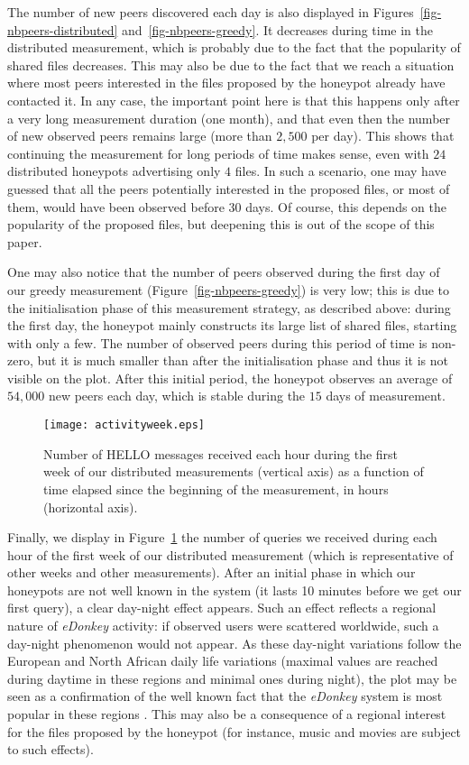 \documentclass[final,
notitlepage,
narroweqnarray,
	inline,
	twoside,
]{ieee}
\begin{document}
The number of new peers discovered each day is also displayed in Figures~\ref{fig-nbpeers-distributed} and~\ref{fig-nbpeers-greedy}. It decreases during time in the distributed measurement, which is probably due to the fact that the popularity of shared files decreases. This may also be due to the fact that we reach a situation where most peers interested in the files proposed by the honeypot already have contacted it. In any case, the important point here is that this happens only after a very long measurement duration (one month), and that even then the number of new observed peers remains large (more than $2,500$ per day). This shows that continuing the measurement for long periods of time makes sense, even with $24$ distributed honeypots advertising only $4$ files. In such a scenario, one may have guessed that all the peers potentially interested in the proposed files, or most of them, would have been observed before $30$ days. Of course, this depends on the popularity of the proposed files, but deepening this is out of the scope of this paper.

One may also notice that the number of peers observed during the first day of our greedy measurement (Figure~\ref{fig-nbpeers-greedy}) is very low; this is due to the initialisation phase of this measurement strategy, as described above: during the first day, the honeypot mainly constructs its large list of shared files, starting with only a few. The number of observed peers during this period of time is non-zero, but it is much smaller than after the initialisation phase and thus it is not visible on the plot. After this initial period, the honeypot observes an average of $54,000$ new peers each day, which is stable during the $15$ days of measurement.

\begin{figure}[h!]
\centering
\texttt{[image: activityweek.eps]}
\caption{Number of HELLO messages received each hour   during the first
  week of our distributed measurements (vertical axis)
  as a function of  time elapsed
  since the beginning of the measurement, in hours (horizontal axis).}
\label{fig-nbpeers-time}
\end{figure}

Finally, we display in Figure~\ref{fig-nbpeers-time} the number of
queries we received during each hour of the first week of our
distributed measurement (which is representative of other weeks and
other measurements). After an initial phase in which our honeypots are
not well known in the system (it lasts 10 minutes before we get our
first query), a clear day-night effect appears. Such an effect
reflects a regional nature of {\em eDonkey} activity: if observed users were
scattered worldwide, such a day-night phenomenon would not appear. As
these day-night variations follow the European and North African daily
life variations (maximal values are reached during daytime in these
regions and minimal ones during night), the plot may be seen as a
confirmation of the well known fact that the {\em eDonkey} system is most
popular in these regions \cite{fed1,fed2}. This may also be a
consequence of a regional interest for the files proposed by the
honeypot (for instance, music and movies are subject to such effects).
\end{document}
